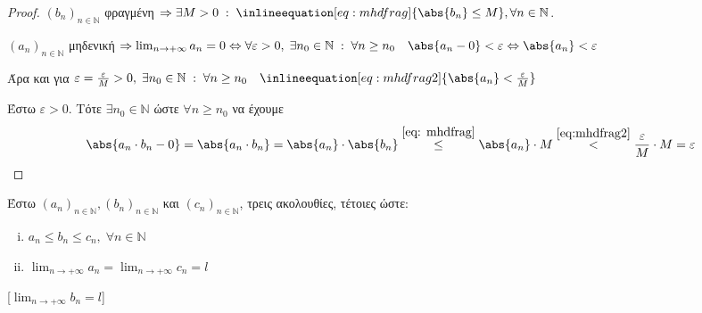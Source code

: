 \documentclass[main.tex]{subfiles}
\begin{document}
\begin{proof}
\item {}
    $ (b_{n})_{n \in \mathbb{N}} $ φραγμένη $ \Rightarrow \exists M>0 \; : \; \inlineequation[eq:
    mhdfrag]{\abs{b_{n}} \leq M}, \forall n \in \mathbb{N} $.

    $ (a_{n})_{n \in \mathbb{N}} $ μηδενική $ \Rightarrow \lim_{n \to +\infty} a_{n} = 0
    \Leftrightarrow  \forall \varepsilon >0, \; \exists n_{0} \in \mathbb{N} \; : \; \forall 
    n \geq n_{0} \quad \abs{a_{n}-0} < \varepsilon \Leftrightarrow \abs{a_{n}} < \varepsilon $ 

    Άρα και για $ \varepsilon = \frac{\varepsilon}{M} >0, \; \exists n_{0} \in \mathbb{N} \; : \; 
    \forall n \geq n_{0} \quad \inlineequation[eq:mhdfrag2]{\abs{a_{n}} < \frac{\varepsilon}{M}} $ 

    Έστω $ \varepsilon >0 $. Τότε $ \exists n_{0} \in \mathbb{N} $ ώστε $ \forall n \geq n_{0} $ 
    να έχουμε 
    \[
        \abs{a_{n}\cdot b_{n} - 0} = \abs{a_{n}\cdot b_{n} } = \abs{a_{n}} \cdot \abs{b_{n}} 
        \overset{\eqref{eq: mhdfrag}}{\leq} \abs{a_{n}} \cdot M \overset{\eqref{eq:mhdfrag2}}{<} 
        \frac{\varepsilon}{M} \cdot M = \varepsilon
     \]
\end{proof}

\begin{prop}
\item {}
    Έστω $ (a_{n})_{n \in \mathbb{N}}, (b_{n})_{n \in \mathbb{N}} $ και 
    $ (c_{n})_{n \in \mathbb{N}} $, τρεις ακολουθίες, τέτοιες ώστε:

    \vspace{\baselineskip}

    \begin{minipage}{0.3\textwidth}
    \begin{enumerate}[i)]
        \item $ a_{n} \leq b_{n} \leq c_{n}, \; \forall n \in \mathbb{N} $ \hfill {} 
        \item $ \lim_{n \to +\infty} a_{n} = \lim_{n \to +\infty} c_{n} = l $ \hfill {}
    \end{enumerate}
\end{minipage}

    [$ \lim_{n \to +\infty} b_{n} = l$]
\end{prop}
\end{document}

